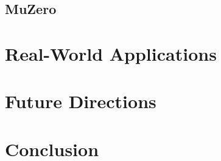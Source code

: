 \documentclass[conference]{IEEEtran}
\begin{document}
\subsection{MuZero}


\section{Real-World Applications}


\section{Future Directions}


\section*{Conclusion}

\end{document}
